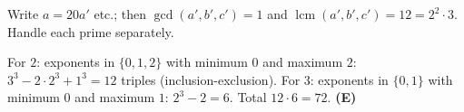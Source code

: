 Write $a=20a'$ etc.; then $\gcd(a',b',c')=1$ and $\operatorname{lcm}(a',b',c')=12=2^2\cdot3$. Handle each prime separately.

For $2$: exponents in $\{0,1,2\}$ with minimum $0$ and maximum $2$: $3^3-2\cdot2^3+1^3=12$ triples (inclusion-exclusion). For $3$: exponents in $\{0,1\}$ with minimum $0$ and maximum $1$: $2^3-2=6$. Total $12\cdot6=72$. \textbf{(E)}
